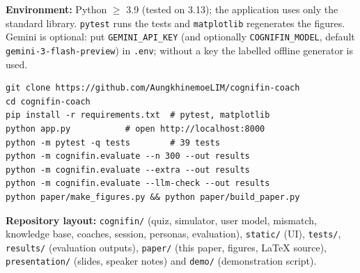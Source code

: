 \documentclass[conference]{IEEEtran}
\begin{document}
\textbf{Environment:} Python \ensuremath{\geq} 3.9 (tested on 3.13); the application uses only the standard library. \texttt{pytest} runs the tests and \texttt{matplotlib} regenerates the figures. Gemini is optional: put \texttt{GEMINI\_API\_KEY} (and optionally \texttt{COGNIFIN\_MODEL}, default \texttt{gemini-3-flash-preview}) in \texttt{.env}; without a key the labelled offline generator is used.

\begin{verbatim}
git clone https://github.com/AungkhinemoeLIM/cognifin-coach
cd cognifin-coach
pip install -r requirements.txt  # pytest, matplotlib
python app.py           # open http://localhost:8000
python -m pytest -q tests        # 39 tests
python -m cognifin.evaluate --n 300 --out results
python -m cognifin.evaluate --extra --out results
python -m cognifin.evaluate --llm-check --out results
python paper/make_figures.py && python paper/build_paper.py
\end{verbatim}
\textbf{Repository layout:} \texttt{cognifin/} (quiz, simulator, user model, mismatch, knowledge base, coaches, session, personas, evaluation), \texttt{static/} (UI), \texttt{tests/}, \texttt{results/} (evaluation outputs), \texttt{paper/} (this paper, figures, LaTeX source), \texttt{presentation/} (slides, speaker notes) and \texttt{demo/} (demonstration script).
\end{document}
